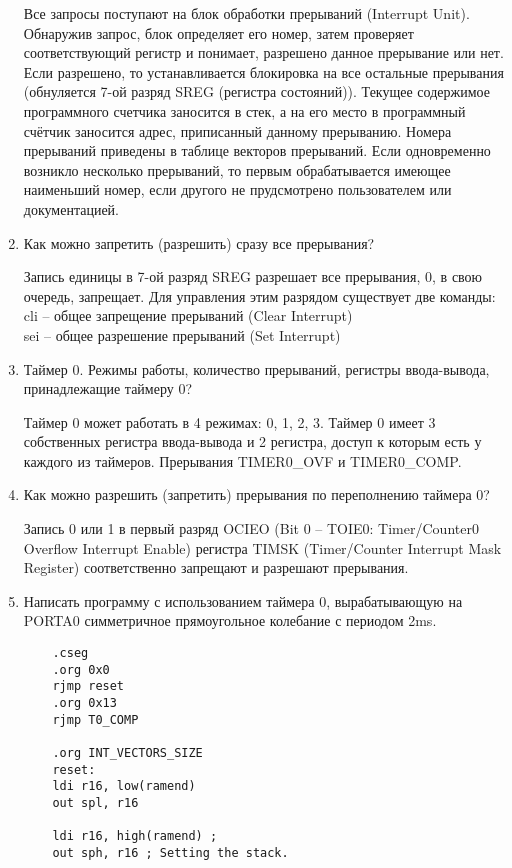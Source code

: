 \documentclass{lab}
\begin{document}
\begin{enumerate}
	Все запросы поступают на блок обработки прерываний (Interrupt Unit). Обнаружив запрос, блок определяет его номер, затем проверяет соответствующий регистр и понимает, разрешено данное прерывание или нет. Если разрешено, то устанавливается блокировка на все остальные прерывания (обнуляется 7-ой разряд SREG (регистра состояний)). Текущее содержимое программного счетчика заносится в стек, а на его место в программный счётчик заносится адрес, приписанный данному прерыванию. Номера прерываний приведены в таблице векторов прерываний. Если одновременно возникло несколько прерываний, то первым обрабатывается имеющее наименьший номер, если другого не прудсмотрено пользователем или документацией.
	
	\item Как можно запретить (разрешить) сразу все прерывания?
	
	Запись единицы в 7-ой разряд SREG разрешает все прерывания, 0, в свою очередь, запрещает. Для управления этим разрядом существует две команды: \\
	cli – общее запрещение прерываний (Clear Interrupt)\\
	sei – общее разрешение прерываний (Set Interrupt)
	
	
	\item Таймер 0. Режимы работы, количество прерываний, регистры ввода-вывода, принадлежащие таймеру 0?
	
	Таймер 0 может работать в 4 режимах: 0, 1, 2, 3. Таймер 0 имеет 3 собственных регистра ввода-вывода и 2 регистра, доступ к которым есть у каждого из таймеров. Прерывания TIMER0\_OVF и TIMER0\_COMP.
	
	\item Как можно разрешить (запретить) прерывания по переполнению таймера 0?
	
	Запись 0 или 1 в первый разряд OCIEO (Bit 0 – TOIE0: Timer/Counter0 Overflow Interrupt Enable) регистра TIMSK (Timer/Counter Interrupt Mask Register) соответственно запрещают и разрешают прерывания.
	
	\item Написать программу с использованием таймера 0, вырабатывающую на PORTA0 симметричное прямоугольное колебание с периодом 2ms.
	
	{\small
	\begin{verbatim}
	.cseg
	.org 0x0
	rjmp reset
	.org 0x13
	rjmp T0_COMP
	
	.org INT_VECTORS_SIZE
	reset:
	ldi r16, low(ramend)
	out spl, r16
	
	ldi r16, high(ramend) ;
	out sph, r16 ; Setting the stack.
	

\end{verbatim}}
\end{enumerate}
\end{document}

